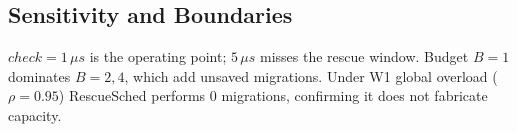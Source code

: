 \subsection{Sensitivity and Boundaries}
$check{=}1\,\mu s$ is the operating point; $5\,\mu s$ misses the rescue
window. Budget $B{=}1$ dominates $B{=}2,4$, which add unsaved migrations.
Under W1 global overload ($\rho{=}0.95$) RescueSched performs $0$
migrations, confirming it does not fabricate capacity.